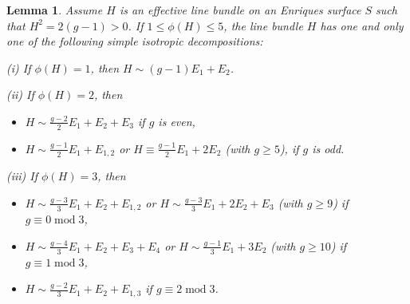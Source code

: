 \documentclass[11pt]{amsart}
\newtheorem{lemma}[thm]{Lemma}
\theoremstyle{definition}
\begin{document}
\begin{lemma} \label{lemma:decomp}
  Assume $H$ is an effective line bundle on an Enriques surface $S$ such that $H^2=2(g-1) >0$. If $1 \leqslant \phi(H) \leqslant 5$, the line bundle $H$ has one and only one of the following simple isotropic decompositions:

(i) If $\phi(H)=1$, then $H \sim (g-1)E_1+E_2$. 

(ii) If $\phi(H)=2$, then 
\begin{itemize}
\item $H \sim \frac{g-2}{2}E_1 +E_2 +E_3$ if $g$ is even,
\item $H \sim \frac{g-1}{2}E_1 +E_{1,2}$ or $H \equiv \frac{g-1}{2}E_1 +2E_2$ (with $g \geqslant 5$), if $g$ is odd. 
\end{itemize}


(iii) If $\phi(H)=3$, then 
\begin{itemize}
 \item $H \sim \frac{g-3}{3}E_1+E_2+E_{1,2}$ or $H \sim \frac{g-3}{3}E_1+2E_2+E_3$
 (with $g \geqslant 9$) if $g \equiv 0 \; \mbox{mod} \; 3$,
\item $H \sim \frac{g-4}{3}E_1+E_2+E_3+E_4$ or $H \sim \frac{g-1}{3}E_1+3E_2$
 (with $g \geqslant 10$) if $g \equiv 1 \; \mbox{mod} \; 3$,
\item $H \sim \frac{g-2}{3}E_1+E_2+E_{1,3}$ if $g \equiv 2 \; \mbox{mod} \; 3$.
\end{itemize}


\end{lemma}
\end{document}
